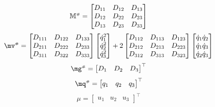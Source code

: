 \documentclass[a4paper,11pt,brazil,fleqn]{article}
\begin{document}
\begin{equation}\label{eq:Mh3dof}
\mathbb{M}^{\scriptscriptstyle \#} = 
\begin{bmatrix}
D_{11} & D_{12} & D_{13} \\
D_{12} & D_{22} & D_{23} \\
D_{13} & D_{23} & D_{33} \\
\end{bmatrix}
\end{equation}
\begin{equation}\label{eq:vh3dof}
\mv\ssh = 
\begin{bmatrix}
D_{111} & D_{122} & D_{133} \\
D_{211} & D_{222} & D_{233} \\
D_{311} & D_{322} & D_{333} \\
\end{bmatrix}
\begin{bmatrix}
\dot{q}_1^2 \\
\dot{q}_2^2 \\
\dot{q}_3^2 \\
\end{bmatrix}
+
2\begin{bmatrix}
D_{112} & D_{113} & D_{123} \\
D_{212} & D_{213} & D_{223} \\
D_{312} & D_{313} & D_{323} \\
\end{bmatrix}
\begin{bmatrix}
\dot{q}_1 \dot{q}_2 \\
\dot{q}_1 \dot{q}_3 \\
\dot{q}_2 \dot{q}_3 \\
\end{bmatrix}
\end{equation}
\begin{equation}\label{eq:gh3dof}
\mg\ssh =
\begin{bmatrix}
D_1 &
D_2 &
D_3
\end{bmatrix}^\top
\end{equation}
\begin{equation}\label{eq:qh3dof}
\mq\ssh =
\begin{bmatrix}
q_1 &
q_2 &
q_3
\end{bmatrix}^\top
\end{equation}
\begin{equation}\label{eq:u3dof}
\mu =
\begin{bmatrix}
u_1 &
u_2 &
u_3
\end{bmatrix}^\top
\end{equation}
\end{document}
